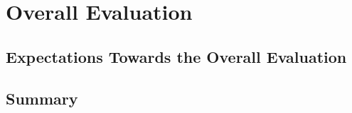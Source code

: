 \chapter{Overall Evaluation}
\label{chap:overallEvaluation}

\section{Expectations Towards the Overall Evaluation} 


\section{Summary}